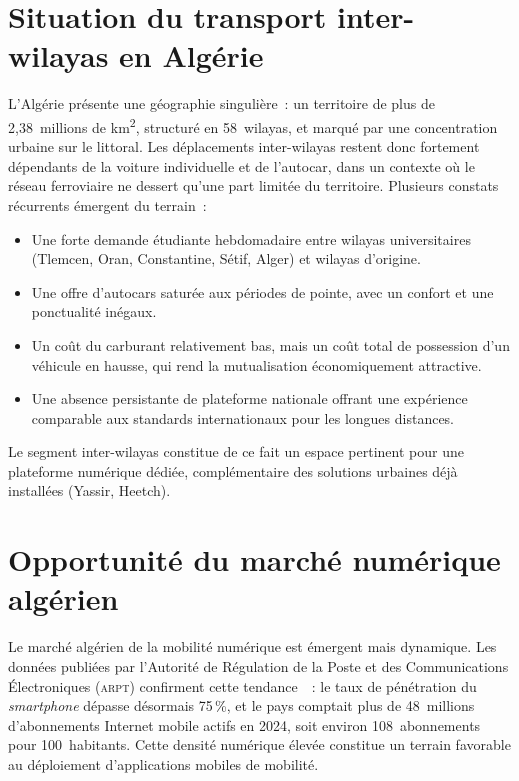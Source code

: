 \documentclass[12pt, a4paper, oneside]{report}
\begin{document}
\section{Situation du transport inter-wilayas en Algérie}
\label{sec:transport-algerie}

L'Algérie présente une géographie singulière~: un territoire de plus de 2,38~millions de km\textsuperscript{2}, structuré en 58~wilayas, et marqué par une concentration urbaine sur le littoral. Les déplacements inter-wilayas restent donc fortement dépendants de la voiture individuelle et de l'autocar, dans un contexte où le réseau ferroviaire ne dessert qu'une part limitée du territoire. Plusieurs constats récurrents émergent du terrain~:
\begin{itemize}
  \item Une forte demande étudiante hebdomadaire entre wilayas universitaires (Tlemcen, Oran, Constantine, Sétif, Alger) et wilayas d'origine.
  \item Une offre d'autocars saturée aux périodes de pointe, avec un confort et une ponctualité inégaux.
  \item Un coût du carburant relativement bas, mais un coût total de possession d'un véhicule en hausse, qui rend la mutualisation économiquement attractive.
  \item Une absence persistante de plateforme nationale offrant une expérience comparable aux standards internationaux pour les longues distances.
\end{itemize}

Le segment inter-wilayas constitue de ce fait un espace pertinent pour une plateforme numérique dédiée, complémentaire des solutions urbaines déjà installées (Yassir, Heetch).

\section{Opportunité du marché numérique algérien}
\label{sec:opportunite-marche}

Le marché algérien de la mobilité numérique est émergent mais dynamique. Les données publiées par l'Autorité de Régulation de la Poste et des Communications Électroniques (\textsc{arpt}) confirment cette tendance~\cite{arpt_2024}~: le taux de pénétration du \textit{smartphone} dépasse désormais 75\,\%, et le pays comptait plus de 48~millions d'abonnements Internet mobile actifs en 2024, soit environ 108~abonnements pour 100~habitants. Cette densité numérique élevée constitue un terrain favorable au déploiement d'applications mobiles de mobilité.
\end{document}
